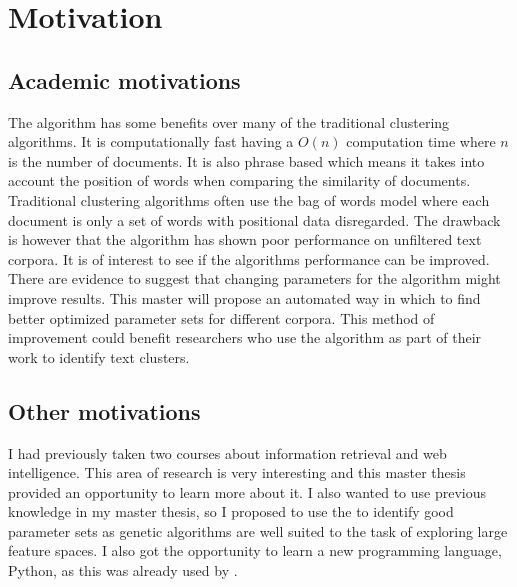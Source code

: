 
\section{Motivation}
\subsection{Academic motivations}

The \STC algorithm has some benefits over many of the traditional clustering algorithms. It is computationally fast having a \begin{math}O(n)\end{math} computation time where \(n\) is the number of documents. It is also phrase based which means it takes into account the position of words when comparing the similarity of documents. Traditional clustering algorithms often use the bag of words model where each document is only a set of words with positional data disregarded. The drawback is however that the \STC algorithm has shown poor performance on unfiltered text corpora. It is of interest to see if the algorithms performance can be improved. There are evidence to suggest that changing parameters for the algorithm might improve results. This master will propose an automated way in which to find better optimized parameter sets for different corpora. This method of improvement could benefit researchers who use the algorithm as part of their work to identify text clusters.

\subsection{Other motivations}
I had previously taken two courses about information retrieval and web intelligence. This area of research is very interesting and this master thesis provided an opportunity to learn more about it. I also wanted to use previous knowledge in my master thesis, so I proposed to use the \GA to identify good parameter sets as genetic algorithms are well suited to the task of exploring large feature spaces. I also got the opportunity to learn a new programming language, Python, as this was already used by \supervisor.



